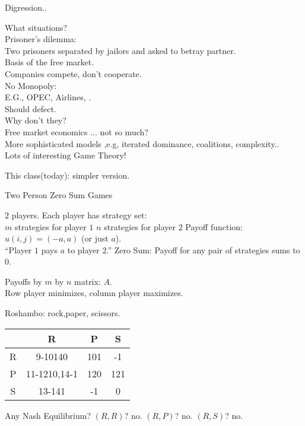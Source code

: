 \begin{frame}{Digression..}

What situations? \\

Prisoner's dilemma: \\ 
Two prisoners separated by jailors and asked to betray partner. \\

Basis of the free market. \\ 
Companies compete, don't cooperate. \\ 
No Monopoly: \\ 
E.G., OPEC, Airlines, . \\ 
Should defect. \\ 
Why don't they? \\ 
Free market economics ... not so much? \\ 
More sophisticated models ,e.g, iterated dominance,  coalitions,  complexity.. \\ 
Lots of interesting Game Theory!

This class(today): simpler version.
\end{frame}

\begin{frame}{Two Person Zero Sum Games}

$2$ players.
Each player has strategy set: \\
 $m$ strategies for player $1$
$n$ strategies for player $2$
Payoff function:  $u(i,j) = (-a,a)$ (or just $a$). \\
``Player $1$ pays $a$ to player $2$.''
Zero Sum: Payoff for any pair of strategies sums to $0$. 

Payoffs by $m$ by $n$ matrix: $A$. \\  %
Row player minimizes, column player maximizes.

Roshambo: rock,paper, scissors.

\begin{tabular}{c| c| c| c|}
& \multicolumn{1}{c}{R} & \multicolumn{1}{c}{P} & \multicolumn{1}{c}{S} \\
\hline 
R & {9-10}{{14}{0}} & {10}{1} & -1 \\
P & {11-12}{{10,14}{-1}} & {12}{0} & {12}{1} \\
S & {13-14}{1} & -1 & 0 \\
\end{tabular}

Any Nash Equilibrium?
$(R,R)$?  no.  %
$(R,P)$?  no.  %
$(R,S)$?  no.  %

\end{frame}


